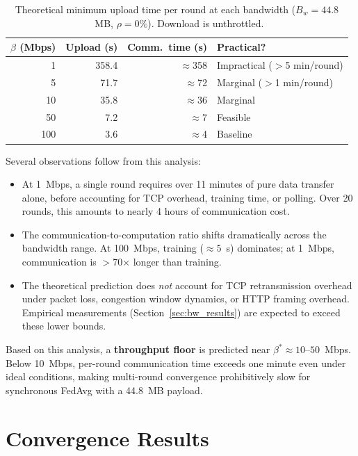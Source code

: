 \documentclass[12pt,a4paper]{report}
\begin{document}
\begin{table}[H]
\centering
\caption{Theoretical minimum upload time per round at each bandwidth
  ($B_w = 44.8$~MB, $\rho = 0\%$).  Download is unthrottled.}
\label{tab:theory}
\begin{tabular}{rrrl}
\toprule
$\beta$ (Mbps) & Upload (s) & Comm.\ time (s) & Practical? \\
\midrule
  1   & 358.4 & $\approx$358 & Impractical ($>$5 min/round) \\
  5   &  71.7 & $\approx$72  & Marginal ($>$1 min/round) \\
 10   &  35.8 & $\approx$36  & Marginal \\
 50   &   7.2 & $\approx$7   & Feasible \\
100   &   3.6 & $\approx$4   & Baseline \\
\bottomrule
\end{tabular}
\end{table}

Several observations follow from this analysis:

\begin{itemize}
  \item At 1~Mbps, a single round requires over 11 minutes of pure data
        transfer alone, before accounting for TCP overhead, training
        time, or polling.  Over 20 rounds, this amounts to nearly 4
        hours of communication cost.
  \item The communication-to-computation ratio shifts dramatically across
        the bandwidth range.  At 100~Mbps, training ($\approx 5$~s)
        dominates; at 1~Mbps, communication is $>$70$\times$ longer
        than training.
  \item The theoretical prediction does \emph{not} account for TCP
        retransmission overhead under packet loss, congestion window
        dynamics, or HTTP framing overhead.  Empirical measurements
        (Section~\ref{sec:bw_results}) are expected to exceed these
        lower bounds.
\end{itemize}

Based on this analysis, a \textbf{throughput floor} is predicted near
$\beta^* \approx 10$--$50$~Mbps.  Below 10~Mbps, per-round
communication time exceeds one minute even under ideal conditions,
making multi-round convergence prohibitively slow for synchronous
FedAvg with a 44.8~MB payload.

\section{Convergence Results}
\label{sec:results}
\end{document}
